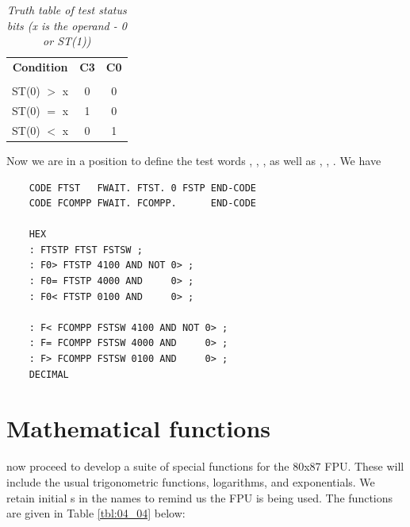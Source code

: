 \begin{table}
    \caption{\textit{Truth table of test status bits (x is the operand - 0 or ST(1))}}
    \label{tbl:04_03}
    \begin{center}
        \begin{tabular}{|c c c|}
            \hline
            \textbf{Condition} &   \textbf{C3} & \textbf{C0} \\
                             &               &             \\
            ST(0) $>$ x      &   0           & 0           \\
            ST(0) $=$ x      &   1           & 0           \\
            ST(0) $<$ x      &   0           & 1           \\
            \hline
        \end{tabular}
    \end{center}
\end{table}

Now we are in a position to define the test words , ,
, as well as , , . We have

\begin{lstlisting}
    CODE FTST   FWAIT. FTST. 0 FSTP END-CODE
    CODE FCOMPP FWAIT. FCOMPP.      END-CODE

    HEX
    : FTSTP FTST FSTSW ;
    : F0> FTSTP 4100 AND NOT 0> ;
    : F0= FTSTP 4000 AND     0> ;
    : F0< FTSTP 0100 AND     0> ;
    
    : F< FCOMPP FSTSW 4100 AND NOT 0> ;
    : F= FCOMPP FSTSW 4000 AND     0> ;
    : F> FCOMPP FSTSW 0100 AND     0> ;
    DECIMAL
\end{lstlisting}
\section{Mathematical functions}

 now proceed to develop a suite of special functions for the 80x87 FPU. These will include the usual trigonometric functions, logarithms, and exponentials. We retain initial s in the names to remind us the FPU is being used. The functions are given in Table \ref{tbl:04_04} below:


